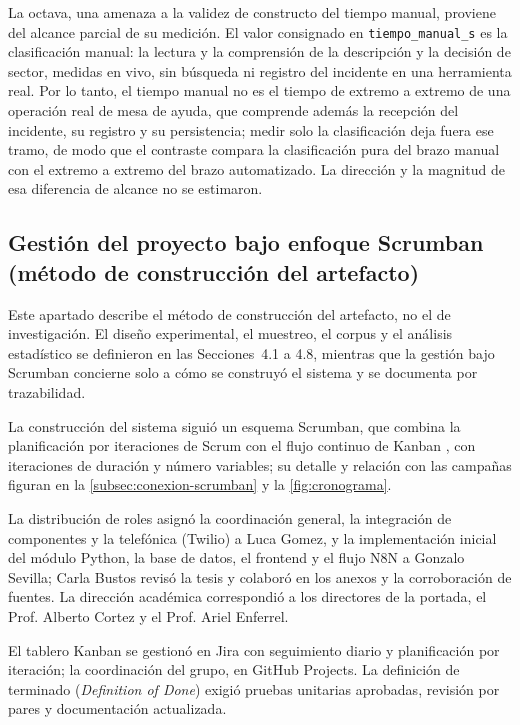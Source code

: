 La octava, una amenaza a la validez de constructo del tiempo manual, proviene del alcance parcial de su medición. El valor consignado en \texttt{tiempo\_manual\_s} es la clasificación manual: la lectura y la comprensión de la descripción y la decisión de sector, medidas en vivo, sin búsqueda ni registro del incidente en una herramienta real. Por lo tanto, el tiempo manual no es el tiempo de extremo a extremo de una operación real de mesa de ayuda, que comprende además la recepción del incidente, su registro y su persistencia; medir solo la clasificación deja fuera ese tramo, de modo que el contraste compara la clasificación pura del brazo manual con el extremo a extremo del brazo automatizado. La dirección y la magnitud de esa diferencia de alcance no se estimaron.

\subsection{Gestión del proyecto bajo enfoque Scrumban (método de construcción del artefacto)}\label{subsec:gestion-scrumban}

Este apartado describe el método de construcción del artefacto, no el de investigación. El diseño experimental, el muestreo, el corpus y el análisis estadístico se definieron en las Secciones~4.1 a 4.8, mientras que la gestión bajo Scrumban concierne solo a cómo se construyó el sistema y se documenta por trazabilidad.

La construcción del sistema siguió un esquema Scrumban, que combina la planificación por iteraciones de Scrum con el flujo continuo de Kanban \parencite{Ladas2009_scrumban}, con iteraciones de duración y número variables; su detalle y relación con las campañas figuran en la \autoref{subsec:conexion-scrumban} y la \autoref{fig:cronograma}.

La distribución de roles asignó la coordinación general, la integración de componentes y la telefónica (Twilio) a Luca Gomez, y la implementación inicial del módulo Python, la base de datos, el frontend y el flujo N8N a Gonzalo Sevilla; Carla Bustos revisó la tesis y colaboró en los anexos y la corroboración de fuentes. La dirección académica correspondió a los directores de la portada, el Prof. Alberto Cortez y el Prof. Ariel Enferrel.

El tablero Kanban se gestionó en Jira con seguimiento diario y planificación por iteración; la coordinación del grupo, en GitHub Projects. La definición de terminado (\emph{Definition of Done}) exigió pruebas unitarias aprobadas, revisión por pares y documentación actualizada.

\newpage
